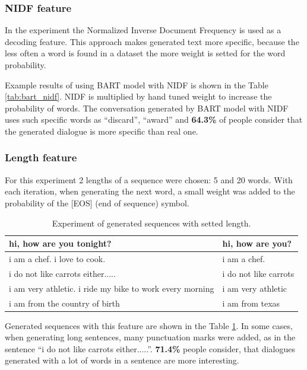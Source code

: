 \subsubsection{NIDF feature}
In the experiment the Normalized Inverse Document Frequency is used as a decoding feature. This approach makes generated text more specific, because the less often a word is found in a dataset the more weight is setted for the word probability. 

Example results of using BART model with NIDF is shown in the Table \ref{tab:bart_nidf}. NIDF is multiplied by hand tuned weight to increase the probability of words. The conversation generated by BART model with NIDF uses such specific words as ``discard'', ``award'' and \textbf{64.3\%} of people consider that the generated dialogue is more specific than real one.

\subsubsection{Length feature}
For this experiment 2 lengths of a sequence were chosen: 5 and 20 words. With each iteration, when generating the next word, a small weight was added to the probability of the [EOS] (end of sequence) symbol.

\begin{table}[ht]
\centering
 \begin{tabular}{|p{7cm}|p{7cm}|} 
 \hline\hline
   hi, how are you tonight? & hi, how are you?\\
 \hline
  i am a chef. i love to cook. & i am a chef. \\
 \hline
  i do not like carrots either..... & i do not like carrots\\
 \hline 
  i am very athletic. i ride my bike to work every morning & i am very athletic\\
 \hline 
 i am from the country of birth & i am from texas\\
 \hline\hline
 \end{tabular}
 \caption{Experiment of generated sequences with setted length.}
\label{tab:set_len}
\end{table}

Generated sequences with this feature are shown in the Table \ref{tab:set_len}. In some cases, when generating long sentences, many punctuation marks were added, as in the sentence ``i do not like carrots either.....''. \textbf{71.4\%} people consider, that dialogues generated with a lot of words in a sentence are more interesting.

